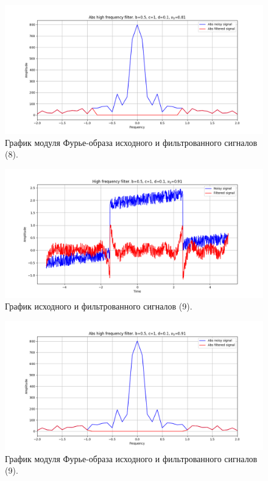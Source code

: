 \documentclass[a4paper, 12pt]{article}
\begin{document}
    \begin{figure}[!htb]
        \centering
        \includegraphics[scale=0.48]{8_abs_u_U_nolow.png}
        \captionsetup{skip=0pt}
        \caption{График модуля Фурье-образа исходного и фильтрованного сигналов (8).}
        \label{fig:fig42}
    \end{figure}
    \begin{figure}[!htb]
        \centering
        \includegraphics[scale=0.48]{9_u_flt_u_nolow.png}
        \captionsetup{skip=0pt}
        \caption{График исходного и фильтрованного сигналов (9).}
        \label{fig:fig43}
    \end{figure}
    \newpage
    \begin{figure}[!htb]
        \centering
        \includegraphics[scale=0.48]{9_abs_u_U_nolow.png}
        \captionsetup{skip=0pt}
        \caption{График модуля Фурье-образа исходного и фильтрованного сигналов (9).}
        \label{fig:fig44}
    \end{figure}
\end{document}
